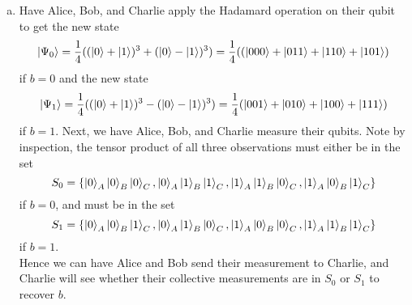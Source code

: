 \documentclass[12pt]{article}
\begin{document}
\begin{enumerate}
\begin{enumerate}[(a)]
\item Have Alice, Bob, and Charlie apply the Hadamard operation on their qubit to get the new state $$\ket{\Psi_0} = \frac{1}4((\ket{0}+\ket{1})^3 + (\ket{0}-\ket{1})^3) = \frac{1}4((\ket{000}+\ket{011}+\ket{110}+\ket{101})$$ if $b=0$ and the new state $$ \ket{\Psi_1} = \frac{1}4((\ket{0}+\ket{1})^3 - (\ket{0} - \ket{1})^3) = \frac{1}4 (\ket{001}+\ket{010}+\ket{100}+\ket{111})$$ if $b=1$. Next, we have Alice, Bob, and Charlie measure their qubits. Note by inspection, the tensor product of all three observations must either be in the set $$S_0 = \{\ket{0}_A\ket{0}_B\ket{0}_C, \ket{0}_A\ket{1}_B\ket{1}_C,  \ket{1}_A\ket{1}_B\ket{0}_C,\ket{1}_A\ket{0}_B\ket{1}_C\}$$ if $b=0$, and must be in the set $$S_1 = \{\ket{0}_A\ket{0}_B\ket{1}_C, \ket{0}_A\ket{1}_B\ket{0}_C,  \ket{1}_A\ket{0}_B\ket{0}_C,\ket{1}_A\ket{1}_B\ket{1}_C\}$$ if $b=1$. \\ 

 Hence we can have Alice and Bob send their measurement to Charlie, and Charlie will see whether their collective measurements are in $S_0$ or $S_1$ to recover $b$.
\end{enumerate} 





\end{enumerate}
\end{document}
